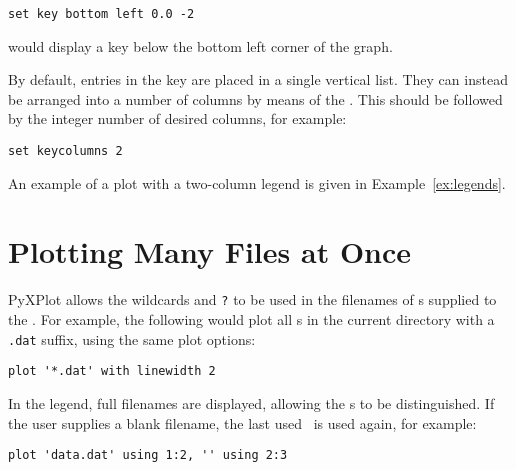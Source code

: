 \begin{verbatim}
set key bottom left 0.0 -2
\end{verbatim}

\noindent would display a key below the bottom left corner of the graph.

By default, entries in the key are placed in a single vertical list. They can
instead be arranged into a number of columns by means of the . This should be followed by the integer number of desired columns,
for example:

\begin{verbatim}
set keycolumns 2
\end{verbatim}

\noindent An example of a plot with a two-column legend is given in
Example~\ref{ex:legends}.


\section{Plotting Many Files at Once}


PyXPlot allows the wildcards {\tt *} and {\tt ?} to be used in the filenames of
\datafile s supplied to the .  For example, the following would
plot all \datafile s in the current directory with a {\tt .dat} suffix, using
the same plot options:

\begin{verbatim}
plot '*.dat' with linewidth 2
\end{verbatim}

\noindent In the legend, full filenames are displayed, allowing the \datafile s
to be distinguished. If the user supplies a blank filename, the last used
\datafile\ is used again, for example:

\begin{verbatim}
plot 'data.dat' using 1:2, '' using 2:3
\end{verbatim}

